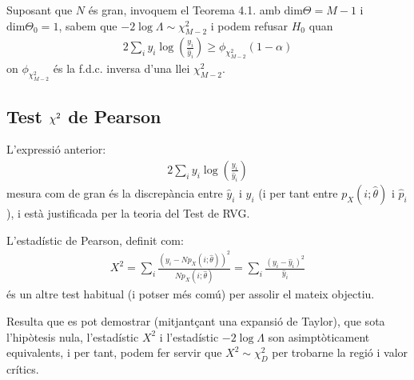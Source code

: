\documentclass[letterpaper,10pt,english]{sphinxmanual}
\begin{document}
Suposant que \(N\) és gran, invoquem el Teorema 4.1. amb \(\mbox{dim}\Theta = M-1\) i \(\mbox{dim}\Theta_0 = 1\),
sabem que \(-2 \log\Lambda \sim \chi^2_{M-2}\) i podem refusar \(H_0\) quan
\begin{equation*}
\begin{split}2 \sum_i y_i \log \left(\frac{y_i}{\hat{y}_i} \right) \geq \phi_{\chi^2_{M-2}}(1-\alpha)\end{split}
\end{equation*}
on \(\phi_{\chi^2_{M-2}}\) és la f.d.c. inversa d’una llei \(\chi^2_{M-2}\).


\subsection{Test \protect\(\chi^2\protect\) de Pearson}
\label{\detokenize{0_Intro/0_4_Tests:test-chi-2-de-pearson}}
L’expressió anterior:
\begin{equation*}
\begin{split}2 \sum_i y_i \log \left(\frac{y_i}{\hat{y}_i} \right)\end{split}
\end{equation*}
mesura com de gran és la discrepància entre \(\hat{y}_i\) i \(y_i\) (i per tant
entre \(p_X(i;\hat{\theta})\) i \(\hat{p}_i\)), i està
justificada per la teoria del Test de RVG.

L’estadístic de Pearson, definit com:
\begin{equation*}
\begin{split}X^2 = \sum_i \frac{\left(y_i - N p_X(i;\hat{\theta}) \right)^2}{ N p_X(i;\hat{\theta})} = \sum_i \frac{\left(y_i - \hat{y}_i\right)^2}{ \hat{y}_i}\end{split}
\end{equation*}
és un altre test habitual (i potser més comú) per assolir el mateix objectiu.

Resulta que es pot demostrar (mitjantçant una expansió de Taylor), que sota l’hipòtesis
nula, l’estadístic \(X^2\) i l’estadístic \(-2\log\Lambda\) son asimptòticament
equivalents, i per tant, podem fer servir que \(X^2 \sim \chi^2_D\) per trobar\sphinxhyphen{}ne la
regió i valor crítics.
\end{document}
